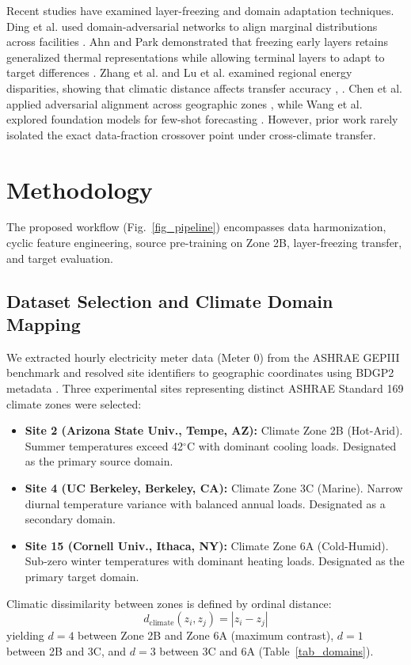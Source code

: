 \documentclass[conference]{IEEEtran}
\begin{document}
Recent studies have examined layer-freezing and domain adaptation techniques. Ding et al. used domain-adversarial networks to align marginal distributions across facilities \cite{b12}. Ahn and Park demonstrated that freezing early layers retains generalized thermal representations while allowing terminal layers to adapt to target differences \cite{b13}. Zhang et al. and Lu et al. examined regional energy disparities, showing that climatic distance affects transfer accuracy \cite{b15}, \cite{b16}. Chen et al. applied adversarial alignment across geographic zones \cite{b17}, while Wang et al. explored foundation models for few-shot forecasting \cite{b18}. However, prior work rarely isolated the exact data-fraction crossover point under cross-climate transfer.

\section{Methodology}
The proposed workflow (Fig.~\ref{fig_pipeline}) encompasses data harmonization, cyclic feature engineering, source pre-training on Zone 2B, layer-freezing transfer, and target evaluation.

\subsection{Dataset Selection and Climate Domain Mapping}
We extracted hourly electricity meter data (Meter 0) from the ASHRAE GEPIII benchmark \cite{b1} and resolved site identifiers to geographic coordinates using BDGP2 metadata \cite{b2}. Three experimental sites representing distinct ASHRAE Standard 169 climate zones \cite{b20} were selected:
\begin{itemize}
    \item \textbf{Site 2 (Arizona State Univ., Tempe, AZ):} Climate Zone 2B (Hot-Arid). Summer temperatures exceed 42$^\circ$C with dominant cooling loads. Designated as the primary source domain.
    \item \textbf{Site 4 (UC Berkeley, Berkeley, CA):} Climate Zone 3C (Marine). Narrow diurnal temperature variance with balanced annual loads. Designated as a secondary domain.
    \item \textbf{Site 15 (Cornell Univ., Ithaca, NY):} Climate Zone 6A (Cold-Humid). Sub-zero winter temperatures with dominant heating loads. Designated as the primary target domain.
\end{itemize}

Climatic dissimilarity between zones is defined by ordinal distance:
\begin{equation}
d_{\text{climate}}(z_i, z_j) = |z_i - z_j|
\label{eq_dist}
\end{equation}
yielding $d=4$ between Zone 2B and Zone 6A (maximum contrast), $d=1$ between 2B and 3C, and $d=3$ between 3C and 6A (Table~\ref{tab_domains}).
\end{document}

